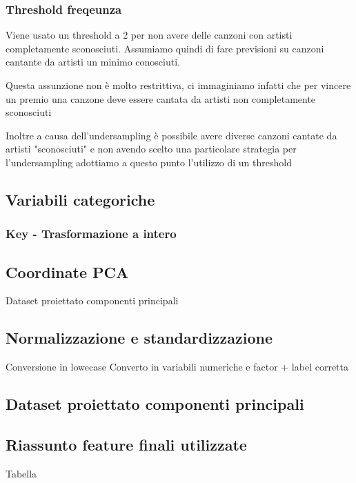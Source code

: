 \subsubsection{Threshold freqeunza}
Viene usato un threshold a 2 per non avere delle canzoni con artisti completamente sconosciuti. Assumiamo quindi di fare previsioni su canzoni cantante da artisti un minimo conosciuti.

Questa assunzione non è molto restrittiva, ci immaginiamo infatti che per vincere un premio una canzone deve essere cantata da artisti non completamente sconosciuti

Inoltre a causa dell'undersampling è possibile avere diverse canzoni cantate da artisti "sconosciuti" e non avendo scelto una particolare strategia per l'undersampling adottiamo a questo punto l'utilizzo di un threshold

\subsection{Variabili categoriche}
\subsubsection{Key - Trasformazione a intero}

\subsection{Coordinate PCA}
Dataset proiettato componenti principali

\subsection{Normalizzazione e standardizzazione}
Conversione in lowecase
Converto in variabili numeriche e factor + label corretta

\subsection{Dataset proiettato componenti principali}

\subsection{Riassunto feature finali utilizzate}
Tabella